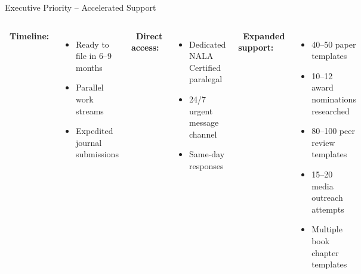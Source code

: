 \documentclass[aspectratio=169, 10pt]{beamer}
\begin{document}
	\begin{frame}{Executive Priority -- Accelerated Support}
		\begin{columns}[T]
			\textbf{\faRocket \ Timeline:}
			\begin{itemize}
				\item Ready to file in 6--9 months
				\item Parallel work streams
				\item Expedited journal submissions
			\end{itemize}
			
			\textbf{\faHeadset \ Direct access:}
			\begin{itemize}
				\item Dedicated NALA Certified paralegal
				\item 24/7 urgent message channel
				\item Same-day responses
			\end{itemize}
			
			\textbf{\faTrophy \ Expanded support:}
			\begin{itemize}
				\item 40--50 paper templates
				\item 10--12 award nominations researched
				\item 80--100 peer review templates
				\item 15--20 media outreach attempts
				\item Multiple book chapter templates
			\end{itemize}
		\end{columns}
	\end{frame}
	
\end{document}
